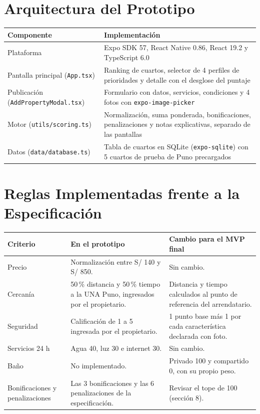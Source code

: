 \documentclass[11pt,a4paper]{article}
\begin{document}
\section{Arquitectura del Prototipo}
{\small
{}
\noindent\begin{tabularx}{\textwidth}{@{}P{4.3cm} L@{}}
\toprule
{}
\textbf{Componente} & \textbf{Implementación} \\
\midrule
Plataforma & Expo SDK 57, React Native 0.86, React 19.2 y TypeScript 6.0 \\
Pantalla principal (\texttt{App.tsx}) & Ranking de cuartos, selector de 4 perfiles de prioridades y detalle con el desglose del puntaje \\
Publicación (\texttt{AddPropertyModal.tsx}) & Formulario con datos, servicios, condiciones y 4 fotos con \texttt{expo-image-picker} \\
Motor (\texttt{utils/scoring.ts}) & Normalización, suma ponderada, bonificaciones, penalizaciones y notas explicativas, separado de las pantallas \\
Datos (\texttt{data/database.ts}) & Tabla de cuartos en SQLite (\texttt{expo-sqlite}) con 5 cuartos de prueba de Puno precargados \\
\bottomrule
\end{tabularx}
}

\section{Reglas Implementadas frente a la Especificación}
{\small
{}
\noindent\begin{tabularx}{\textwidth}{@{}P{2.4cm} L L@{}}
\toprule
{}
\textbf{Criterio} & \textbf{En el prototipo} & \textbf{Cambio para el MVP final} \\
\midrule
Precio & Normalización entre S/ 140 y S/ 850. & Sin cambio. \\
Cercanía & 50\,\% distancia y 50\,\% tiempo a la UNA Puno, ingresados por el propietario. & Distancia y tiempo calculados al punto de referencia del arrendatario. \\
Seguridad & Calificación de 1 a 5 ingresada por el propietario. & 1 punto base más 1 por cada característica declarada con foto. \\
Servicios 24 h & Agua 40, luz 30 e internet 30. & Sin cambio. \\
Baño & No implementado. & Privado 100 y compartido 0, con su propio peso. \\
Bonificaciones y penalizaciones & Las 3 bonificaciones y las 6 penalizaciones de la especificación. & Revisar el tope de 100 (sección 8). \\
\bottomrule
\end{tabularx}
}
\end{document}
